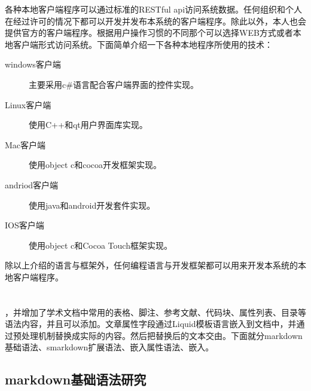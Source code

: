 各种本地客户端程序可以通过标准的RESTful api访问系统数据。任何组织和个人在经过许可的情况下都可以开发并发布本系统的客户端程序。除此以外，本人也会提供官方的客户端程序。根据用户操作习惯的不同那个可以选择WEB方式或者本地客户端形式访问系统。下面简单介绍一下各种本地程序所使用的技术：
\begin{description}
\item[windows客户端] 主要采用c\#语言配合客户端界面的控件实现。
\item[Linux客户端] 使用C++和qt用户界面库实现。
\item[Mac客户端] 使用object c和cocoa开发框架实现。
\item[andriod客户端] 使用java和android开发套件实现。
\item[IOS客户端] 使用object c和Cocoa Touch框架实现。
\end{description}

除以上介绍的语言与框架外，任何编程语言与开发框架都可以用来开发本系统的本地客户端程序。

\section{}
\label{sec:smarkdownsyntax}

，并增加了学术文档中常用的表格、脚注、参考文献、代码块、属性列表、目录等语法内容，并且可以添加。文章属性字段通过Liquid模板语言嵌入到文档中，并通过预处理机制替换成实际的内容。然后把替换后的文本交由。下面就分markdown基础语法、smarkdown扩展语法、嵌入属性语法、嵌入。

\subsection{markdown基础语法研究}
\label{sec:markdownbase}


